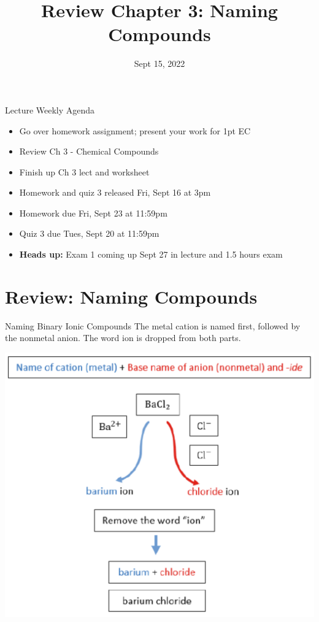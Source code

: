 \documentclass[11pt]{beamer}
\title{Review Chapter 3: Naming Compounds}
\institute{Chemistry Department, Cypress College}
\date{Sept 15, 2022}
\begin{document}
\begin{frame}
  \titlepage
\end{frame}

\begin{frame}{Lecture Weekly Agenda}

  \begin{itemize}
  \item Go over homework assignment; present your work
    for 1pt EC
  \item Review Ch 3 - Chemical Compounds
  \item Finish up Ch 3 lect and worksheet
  \item Homework and quiz 3 released Fri, Sept 16 at 3pm
  \item Homework due Fri, Sept 23 at 11:59pm
  \item Quiz 3 due Tues, Sept 20 at 11:59pm
  \item \textbf{Heads up:} Exam 1 coming up Sept 27 in lecture
    and 1.5 hours exam
  \end{itemize}
\end{frame}

\section{Review: Naming Compounds}

\begin{frame}{Naming Binary Ionic Compounds}
  The metal cation is named first, followed by the nonmetal anion.
  The word ion is dropped from both parts.

  \centering
  \includegraphics[width=0.7\linewidth]{barium_examp.png}
\end{frame}
\end{document}
